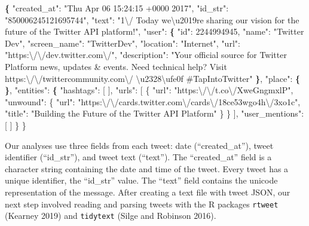 \documentclass[
]{article}
\newenvironment{Shaded}{\begin{snugshade}}{\end{snugshade}}
\newcommand{\BuiltInTok}[1]{#1}
\newcommand{\ExtensionTok}[1]{#1}
\newcommand{\KeywordTok}[1]{\textcolor[rgb]{0.13,0.29,0.53}{\textbf{#1}}}
\newcommand{\NormalTok}[1]{#1}
\newcommand{\StringTok}[1]{\textcolor[rgb]{0.31,0.60,0.02}{#1}}
\begin{document}
\begin{Shaded}
\begin{Highlighting}[]
\KeywordTok{\{}
  \StringTok{"created\_at"}\NormalTok{: }\StringTok{"Thu Apr 06 15:24:15 +0000 2017"}\NormalTok{,}
  \StringTok{"id\_str"}\NormalTok{: }\StringTok{"850006245121695744"}\NormalTok{,}
  \StringTok{"text"}\NormalTok{: }\StringTok{"1\textbackslash{}/ Today we\textbackslash{}u2019re sharing our vision for the future of the Twitter API platform!"}\NormalTok{,}
  \StringTok{"user"}\NormalTok{: }\KeywordTok{\{}
    \StringTok{"id"}\NormalTok{: }\ExtensionTok{2244994945}\NormalTok{,}
    \StringTok{"name"}\NormalTok{: }\StringTok{"Twitter Dev"}\NormalTok{,}
    \StringTok{"screen\_name"}\NormalTok{: }\StringTok{"TwitterDev"}\NormalTok{,}
    \StringTok{"location"}\NormalTok{: }\StringTok{"Internet"}\NormalTok{,}
    \StringTok{"url"}\NormalTok{: }\StringTok{"https:\textbackslash{}/\textbackslash{}/dev.twitter.com\textbackslash{}/"}\NormalTok{,}
    \StringTok{"description"}\NormalTok{: }\StringTok{"Your official source for Twitter Platform news, updates \& events. }
\StringTok{    Need technical help? Visit https:\textbackslash{}/\textbackslash{}/twittercommunity.com\textbackslash{}/ \textbackslash{}u2328\textbackslash{}ufe0f }
\StringTok{    \#TapIntoTwitter"}
  \KeywordTok{\}}\NormalTok{,}
  \StringTok{"place"}\NormalTok{: }\KeywordTok{\{}   
  \KeywordTok{\}}\NormalTok{,}
  \StringTok{"entities"}\NormalTok{: }\KeywordTok{\{}
    \StringTok{"hashtags"}\NormalTok{:}\BuiltInTok{ [}      
\NormalTok{    ],}
    \StringTok{"urls"}\NormalTok{: [}
\NormalTok{      \{}
        \StringTok{"url"}\NormalTok{: }\StringTok{"https:\textbackslash{}/\textbackslash{}/t.co\textbackslash{}/XweGngmxlP"}\NormalTok{,}
        \StringTok{"unwound"}\NormalTok{: \{}
          \StringTok{"url"}\NormalTok{: }\StringTok{"https:\textbackslash{}/\textbackslash{}/cards.twitter.com\textbackslash{}/cards\textbackslash{}/18ce53wgo4h\textbackslash{}/3xo1c"}\NormalTok{,}
          \StringTok{"title"}\NormalTok{: }\StringTok{"Building the Future of the Twitter API Platform"}
\NormalTok{        \}}
\NormalTok{      \}}
\NormalTok{    ],}
    \StringTok{"user\_mentions"}\NormalTok{: [     }
\NormalTok{    ]}
\NormalTok{  \}}
\NormalTok{\}}
\end{Highlighting}
\end{Shaded}

Our analyses use three fields from each tweet: date (``created\_at''), tweet identifier
(``id\_str''), and tweet text (``text''). The ``created\_at'' field is a character string containing
the date and time of the tweet. Every tweet has a unique identifier, the ``id\_str'' value. The
``text'' field contains the unicode representation of the message. After creating a text file
with tweet JSON, our next step involved reading and parsing tweets with the R
packages \texttt{rtweet} (Kearney 2019) and \texttt{tidytext} (Silge and Robinson 2016).
\end{document}
